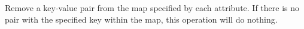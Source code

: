Remove a key-value pair from the map specified by each attribute.  If there is
no pair with the specified key within the map, this operation will do nothing.

